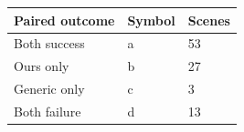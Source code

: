 \begin{tabular}{lll}
\hline
Paired outcome & Symbol & Scenes \\
\hline
Both success & a & 53 \\
Ours only & b & 27 \\
Generic only & c & 3 \\
Both failure & d & 13 \\
\hline
\end{tabular}
